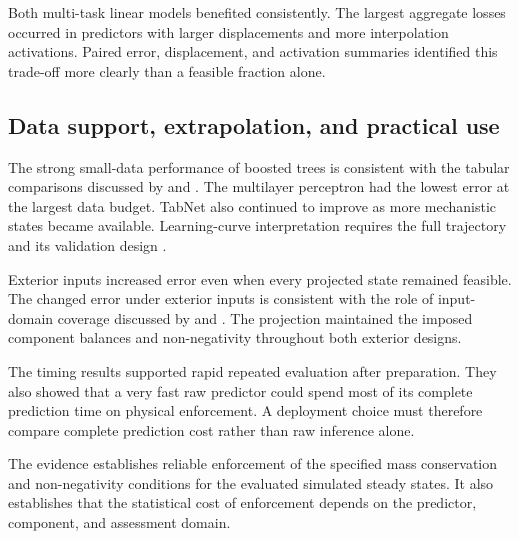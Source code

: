 Both multi-task linear models benefited consistently. The largest aggregate losses occurred in predictors with larger displacements and more interpolation activations. Paired error, displacement, and activation summaries identified this trade-off more clearly than a feasible fraction alone.

\subsection{Data support, extrapolation, and practical use}

The strong small-data performance of boosted trees is consistent with the tabular comparisons discussed by \citet{Borisov2024} and \citet{ShwartzZiv2022}. The multilayer perceptron had the lowest error at the largest data budget. TabNet also continued to improve as more mechanistic states became available. Learning-curve interpretation requires the full trajectory and its validation design \citep{VieringLoog2023}.

Exterior inputs increased error even when every projected state remained feasible. The changed error under exterior inputs is consistent with the role of input-domain coverage discussed by \citet{Shen2023} and \citet{Valente2025}. The projection maintained the imposed component balances and non-negativity throughout both exterior designs.

The timing results supported rapid repeated evaluation after preparation. They also showed that a very fast raw predictor could spend most of its complete prediction time on physical enforcement. A deployment choice must therefore compare complete prediction cost rather than raw inference alone.

The evidence establishes reliable enforcement of the specified mass conservation and non-negativity conditions for the evaluated simulated steady states. It also establishes that the statistical cost of enforcement depends on the predictor, component, and assessment domain.
